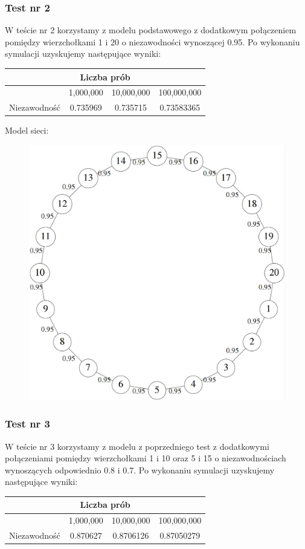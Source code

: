 \documentclass[titlepage]{article}
\begin{document}
\subsubsection{Test nr 2}
W teście nr 2 korzystamy z modelu podstawowego z dodatkowym połączeniem pomiędzy wierzchołkami 1 i 20 o niezawodności wynoszącej 0.95. Po wykonaniu symulacji uzyskujemy następujące wyniki:
\begin{table}[h!]
	\centering
    \label{tab:table1}
    \begin{tabular}{|c|c|c|c|}
    		\multicolumn{4}{c}{Liczba prób}\\
    		\hline
      	& 1,000,000 & 10,000,000 & 100,000,000\\
      	\hline
      	Niezawodność & 0.735969 & 0.735715 & 0.73583365\\
		\hline
    \end{tabular}
\end{table}

\noindent Model sieci:
\begin{figure}[h!]
	\centering
	\includegraphics[width=0.8\linewidth]{graph2.jpg}
\end{figure}

\newpage
\subsubsection{Test nr 3}
W teście nr 3 korzystamy z modelu z poprzedniego test z dodatkowymi połączeniami pomiędzy wierzchołkami 1 i 10 oraz 5 i 15 o niezawodnościach wynoszących odpowiednio 0.8 i 0.7. Po wykonaniu symulacji uzyskujemy następujące wyniki:
\begin{table}[h!]
	\centering
    \label{tab:table1}
    \begin{tabular}{|c|c|c|c|}
    		\multicolumn{4}{c}{Liczba prób}\\
    		\hline
      	& 1,000,000 & 10,000,000 & 100,000,000\\
      	\hline
      	Niezawodność & 0.870627 & 0.8706126 & 0.87050279\\
		\hline
    \end{tabular}
\end{table}
\end{document}
